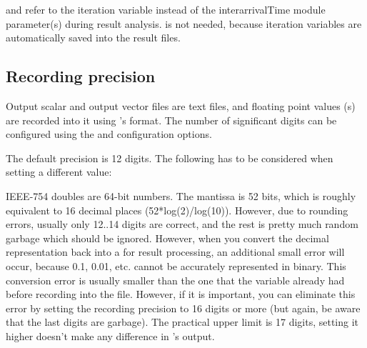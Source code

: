 
and refer to the  iteration variable instead of the
interarrivalTime module parameter(s) during result analysis.
 is not needed, because iteration variables are
automatically saved into the result files.


\subsection{Recording precision}
\label{sec:outputfile-precision}

Output scalar and output vector files are text files, and floating point
values (s) are recorded into it using 's
 format. The number of significant digits can be configured
using the  and 
configuration options.

The default precision is 12 digits. The following has to be considered when
setting a different value:

IEEE-754 doubles are 64-bit numbers. The mantissa is 52 bits, which is
roughly equivalent to 16 decimal places (52*log(2)/log(10)). However, due
to rounding errors, usually only 12..14 digits are correct, and the rest is
pretty much random garbage which should be ignored. However, when you
convert the decimal representation back into a  for result
processing, an additional small error will occur, because 0.1, 0.01, etc.
cannot be accurately represented in binary. This conversion error is
usually smaller than the one that the  variable already had
before recording into the file. However, if it is important, you can
eliminate this error by setting the recording precision to 16 digits or
more (but again, be aware that the last digits are garbage). The practical
upper limit is 17 digits, setting it higher doesn't make any difference in
's output.

%
%
%

